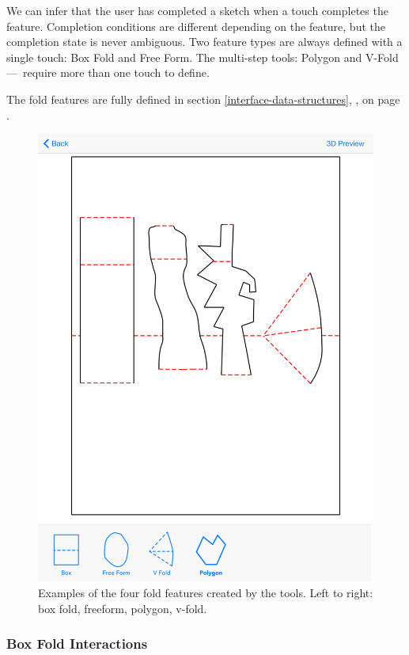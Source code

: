 We can infer that the user has completed a sketch when a touch completes
the feature. Completion conditions are different depending on the
feature, but the completion state is never ambiguous. Two feature types
are always defined with a single touch: Box Fold and Free Form. The
multi-step tools: Polygon and V-Fold ---~require more than one touch to
define.

The fold features are fully defined in section
\ref{interface-data-structures}, , on
page \pageref{interface-data-structures}.

\begin{figure}[htbp]
\centering
\includegraphics{figures/32_UI_Tool_Interactions/foldFeatures.png}
\caption{Examples of the four fold features created by the tools. Left
to right: box fold, freeform, polygon, v-fold.}
\end{figure}

\subsubsection{Box Fold Interactions}\label{box-fold-interactions}

